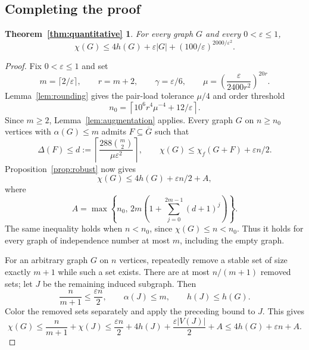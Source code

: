 \documentclass[11pt]{article}
\newtheorem*{quantitativetheorem}{Theorem~\ref{thm:quantitative}}
\begin{document}
\subsection{Completing the proof}

\begin{quantitativetheorem}
For every graph $G$ and every $0<\varepsilon\le1$,
\[
 \chi(G)\le4h(G)+\varepsilon|G|+(100/\varepsilon)^{2000/\varepsilon^2}.
\]
\end{quantitativetheorem}
\begin{proof}
Fix $0<\varepsilon\le1$ and set
\[
 m=\lceil2/\varepsilon\rceil,\qquad r=m+2,\qquad
 \gamma=\varepsilon/6,\qquad
 \mu=\left(\frac{\varepsilon}{2400r^2}\right)^{20r}.
\]
Lemma~\ref{lem:rounding} gives the pair-load tolerance $\mu/4$ and order threshold
\begin{equation}\label{eq:n0}
 n_0=\left\lceil10^6r^4\mu^{-4}+12/\varepsilon\right\rceil.
\end{equation}
Since $m\ge2$, Lemma~\ref{lem:augmentation} applies. Every graph $G$ on $n\ge n_0$
 vertices with $\alpha(G)\le m$ admits $F\subseteq\overline G$ such that
\[
 \Delta(F)\le d:=\left\lceil\frac{288\binom m2}{\mu\varepsilon^2}\right\rceil,
 \qquad
 \chi(G)\le\chi_f(G+F)+\varepsilon n/2.
\]
Proposition~\ref{prop:robust} now gives
\[
 \chi(G)\le4h(G)+\varepsilon n/2+A,
\]
where
\[
 A=\max\left\{n_0,\,
 2m\left(1+\sum_{j=0}^{2m-1}(d+1)^j\right)\right\}.
\]
The same inequality holds when $n<n_0$, since $\chi(G)\le n<n_0$. Thus it holds for
 every graph of independence number at most $m$, including the empty graph.

For an arbitrary graph $G$ on $n$ vertices, repeatedly remove a stable set of size
 exactly $m+1$ while such a set exists. There are at most
$n/(m+1)$ removed sets; let $J$ be the remaining induced subgraph. Then
\[
 \frac{n}{m+1}\le\frac{\varepsilon n}{2},
 \qquad \alpha(J)\le m,\qquad h(J)\le h(G).
\]
Color the removed sets separately and apply the preceding bound to $J$. This gives
\[
 \chi(G)\le\frac{n}{m+1}+\chi(J)
 \le\frac{\varepsilon n}{2}+4h(J)+\frac{\varepsilon |V(J)|}{2}+A
 \le4h(G)+\varepsilon n+A.
\]


\end{proof}
\end{document}
